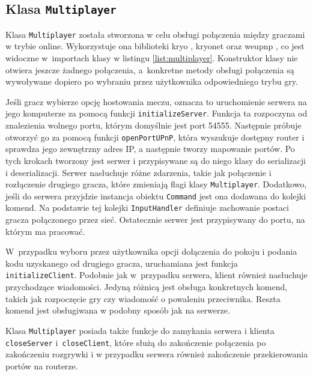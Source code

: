 \subsection{Klasa \texttt{Multiplayer}}
Klasa \texttt{Multiplayer} została stworzona w celu obsługi połączenia między graczami w trybie online. Wykorzystuje ona biblioteki kryo \cite{Kryo}, kryonet \cite{Kryonet} oraz weupnp \cite{weupnp}, co jest widoczne w~importach klasy w listingu \ref{list:multiplayer}. Konstruktor klasy nie otwiera jeszcze żadnego połączenia, a~konkretne metody obsługi połączenia są wywoływane dopiero po wybraniu przez użytkownika odpowiedniego trybu gry. 

Jeśli gracz wybierze opcję hostowania meczu, oznacza to uruchomienie serwera na jego komputerze za pomocą funkcji \texttt{initializeServer}. Funkcja ta rozpoczyna od znalezienia wolnego portu, którym domyślnie jest port 54555. Następnie próbuje otworzyć go za pomocą funkcji \texttt{openPortUPnP}, która wyszukuje dostępny router i sprawdza jego zewnętrzny adres IP, a następnie tworzy mapowanie portów. Po tych krokach tworzony jest serwer i przypisywane są do niego klasy do serializacji i deserializacji. Serwer nasłuchuje różne zdarzenia, takie jak połączenie i rozłączenie drugiego gracza, które zmieniają flagi klasy \texttt{Multiplayer}. Dodatkowo, jeśli do serwera przyjdzie instancja obiektu \texttt{Command} jest ona dodawana do kolejki komend. Na podstawie tej kolejki \texttt{InputHandler} definiuje zachowanie postaci gracza połączonego przez sieć. Ostatecznie serwer jest przypisywany do portu, na którym ma pracować. 

W~przypadku wyboru przez użytkownika opcji dołączenia do pokoju i podania kodu uzyskanego od drugiego gracza, uruchamiana jest funkcja \texttt{initializeClient}. Podobnie jak w~przypadku serwera, klient również nasłuchuje przychodzące wiadomości. Jedyną różnicą jest obsługa konkretnych komend, takich jak rozpoczęcie gry czy wiadomość o powaleniu przeciwnika. Reszta komend jest obsługiwana w podobny sposób jak na serwerze. 

Klasa \texttt{Multiplayer} posiada także funkcje do zamykania serwera i klienta \texttt{closeServer} i~\texttt{closeClient}, które służą do zakończenie połączenia po zakończeniu rozgrywki i w przypadku serwera również zakończenie przekierowania portów na routerze.


